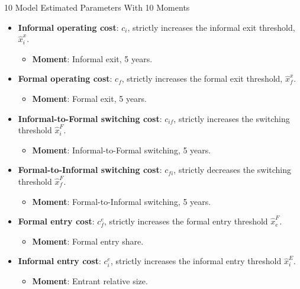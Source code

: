 \documentclass[11pt,aspectratio=169]{beamer}
\begin{document}
\begin{frame}{10 Model Estimated Parameters With 10 Moments}
\begin{itemize}
    \item \textbf{Informal operating cost}: $c_i$, strictly increases the informal exit threshold, $\hat{x}_i^x$.
    \begin{itemize}
        \item \textbf{Moment}: Informal exit, 5 years.
    \end{itemize}
    \vspace{1mm}
    \item \textbf{Formal operating cost}: $c_f$, strictly increases the formal exit threshold, $\hat{x}_f^x$.
    \begin{itemize}
        \item \textbf{Moment}: Formal exit, 5 years.
    \end{itemize}
    \vspace{1mm} 
    \item \textbf{Informal-to-Formal switching cost}: $c_{if}$, strictly increases the switching threshold $\hat{x}_i^F$.
    \begin{itemize}
        \item \textbf{Moment}: Informal-to-Formal switching, 5 years.
    \end{itemize}
    \vspace{1mm}
    \item \textbf{Formal-to-Informal switching cost}: $c_{fi}$, strictly decreases the switching threshold $\hat{x}_f^F$.
    \begin{itemize}
        \item \textbf{Moment}: Formal-to-Informal switching, 5 years.
    \end{itemize}
    \vspace{1mm}
    \item \textbf{Formal entry cost}: $c_f^e$, strictly increases the formal entry threshold $\hat{x}_e^F$.
    \begin{itemize}
        \item \textbf{Moment}: Formal entry share.
    \end{itemize}
    \vspace{1mm}
    \item \textbf{Informal entry cost}: $c_i^e$, strictly increases the informal entry threshold $\hat{x}_i^E$.
    \begin{itemize}
        \item \textbf{Moment}: Entrant relative size.
    \end{itemize}
    \vspace{1mm}

\end{itemize}
\end{frame}
\end{document}
